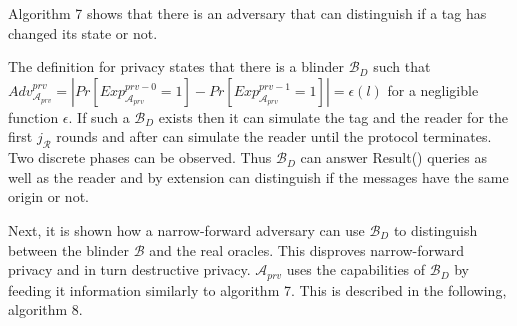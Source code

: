     Algorithm 7 shows that there is an adversary that can distinguish if a tag has changed its state or not.

    The definition for privacy states that there is a blinder $\mathcal{B}_D$ such that $Adv_{\mathcal{A}_{prv}}^{prv} = | Pr[Exp_{\mathcal{A}_{prv}}^{prv-0} = 1] - 
    Pr[Exp_{\mathcal{A}_{prv}}^{prv-1} = 1] | = \epsilon(l)$ for a negligible function $\epsilon$. If such a $\mathcal{B}_D$ exists then it can simulate the tag
    and the reader for the first $j_{\mathcal{R}}$ rounds and after can simulate the reader until the protocol terminates. Two discrete phases can be observed.
    Thus $\mathcal{B}_D$ can answer Result() queries as well as the reader and by extension can distinguish if the messages have the same origin or not.

    Next, it is shown how a narrow-forward adversary can use $\mathcal{B}_D$ to distinguish between the blinder $\mathcal{B}$ and the real oracles. This disproves 
    narrow-forward privacy and in turn destructive privacy. $\mathcal{A}_{prv}$ uses the capabilities of $\mathcal{B}_D$ by feeding it information similarly to 
    algorithm 7. This is described in the following, algorithm 8. 

